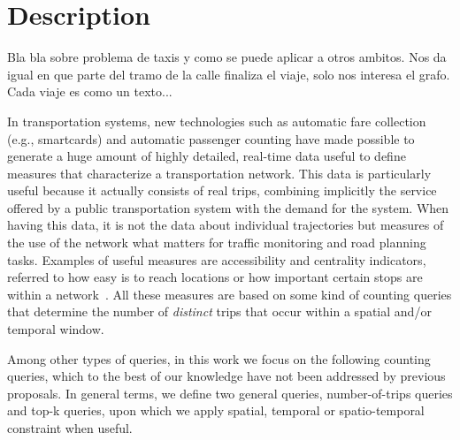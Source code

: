 \section{Description}
Bla bla sobre problema de taxis y como se puede aplicar a otros ambitos. Nos da igual en que parte del tramo de la calle finaliza el viaje, solo nos interesa el grafo. Cada viaje es como un texto...

In  transportation systems, new technologies such as automatic fare collection (e.g., smartcards) and automatic passenger counting have made possible to generate a huge amount of highly detailed,
real-time data useful to define measures that characterize  a transportation network. This data is particularly useful because it actually consists of real trips, combining  implicitly the service offered by a public transportation system with  the demand for the system. When having this data,  it is not the data about individual trajectories but measures of the use of the network what matters for traffic monitoring and road planning tasks. Examples of useful measures are  accessibility and centrality indicators, referred to how easy  is to reach locations or how important certain stops are within a network~\cite{Morency2007193, El-Geneidy2011, Wang2015335}. All these measures are based on some kind of counting queries that determine the number of \textit{distinct} trips that occur within a spatial and/or temporal window.   

Among other types of queries, in this work we focus on the following counting queries, which to the best of our knowledge have not been  addressed by previous proposals. In general terms, we define two general queries, number-of-trips queries and top-k queries, upon which we apply spatial, temporal or spatio-temporal constraint when useful.

